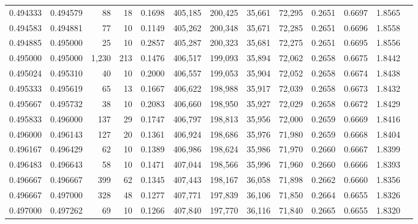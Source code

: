 \begin{tabular}{rrrrrrrrrrrrr}
0.494333 & 0.494579 &    88 &  18 &                                     0.1698 & 405,185 & 200,425 &  35,661 &  72,295 & 0.2651 & 0.6697 & 1.8565 \\
0.494583 & 0.494881 &    77 &  10 &                                     0.1149 & 405,262 & 200,348 &  35,671 &  72,285 & 0.2651 & 0.6696 & 1.8558 \\
0.494885 & 0.495000 &    25 &  10 &                                     0.2857 & 405,287 & 200,323 &  35,681 &  72,275 & 0.2651 & 0.6695 & 1.8556 \\
0.495000 & 0.495000 & 1,230 & 213 &                                     0.1476 & 406,517 & 199,093 &  35,894 &  72,062 & 0.2658 & 0.6675 & 1.8442 \\
0.495024 & 0.495310 &    40 &  10 &                                     0.2000 & 406,557 & 199,053 &  35,904 &  72,052 & 0.2658 & 0.6674 & 1.8438 \\
0.495333 & 0.495619 &    65 &  13 &                                     0.1667 & 406,622 & 198,988 &  35,917 &  72,039 & 0.2658 & 0.6673 & 1.8432 \\
0.495667 & 0.495732 &    38 &  10 &                                     0.2083 & 406,660 & 198,950 &  35,927 &  72,029 & 0.2658 & 0.6672 & 1.8429 \\
0.495833 & 0.496000 &   137 &  29 &                                     0.1747 & 406,797 & 198,813 &  35,956 &  72,000 & 0.2659 & 0.6669 & 1.8416 \\
0.496000 & 0.496143 &   127 &  20 &                                     0.1361 & 406,924 & 198,686 &  35,976 &  71,980 & 0.2659 & 0.6668 & 1.8404 \\
0.496167 & 0.496429 &    62 &  10 &                                     0.1389 & 406,986 & 198,624 &  35,986 &  71,970 & 0.2660 & 0.6667 & 1.8399 \\
0.496483 & 0.496643 &    58 &  10 &                                     0.1471 & 407,044 & 198,566 &  35,996 &  71,960 & 0.2660 & 0.6666 & 1.8393 \\
0.496667 & 0.496667 &   399 &  62 &                                     0.1345 & 407,443 & 198,167 &  36,058 &  71,898 & 0.2662 & 0.6660 & 1.8356 \\
0.496667 & 0.497000 &   328 &  48 &                                     0.1277 & 407,771 & 197,839 &  36,106 &  71,850 & 0.2664 & 0.6655 & 1.8326 \\
0.497000 & 0.497262 &    69 &  10 &                                     0.1266 & 407,840 & 197,770 &  36,116 &  71,840 & 0.2665 & 0.6655 & 1.8320 \\

\end{tabular}
